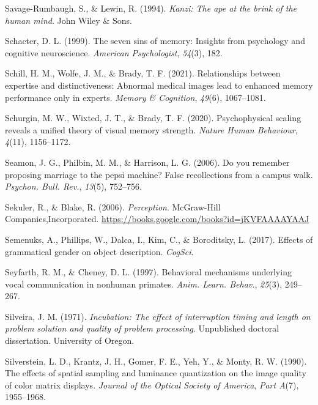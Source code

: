 \documentclass[
]{krantz}
\newlength{\cslhangindent}
\newenvironment{CSLReferences}[2] %
 {\begin{list}{}{%
  \setlength{\itemindent}{0pt}
  \setlength{\leftmargin}{0pt}
  \setlength{\parsep}{0pt}
  \ifodd #1
   \setlength{\leftmargin}{\cslhangindent}
   \setlength{\itemindent}{-1\cslhangindent}
  \fi
  \setlength{\itemsep}{#2\baselineskip}}}
 {\end{list}}
\begin{document}
\begin{CSLReferences}{1}{0}
Savage-Rumbaugh, S., \& Lewin, R. (1994). \emph{Kanzi: The ape at the brink of the human mind}. John Wiley \& Sons.

Schacter, D. L. (1999). The seven sins of memory: Insights from psychology and cognitive neuroscience. \emph{American Psychologist}, \emph{54}(3), 182.

Schill, H. M., Wolfe, J. M., \& Brady, T. F. (2021). Relationships between expertise and distinctiveness: Abnormal medical images lead to enhanced memory performance only in experts. \emph{Memory \& Cognition}, \emph{49}(6), 1067--1081.

Schurgin, M. W., Wixted, J. T., \& Brady, T. F. (2020). Psychophysical scaling reveals a unified theory of visual memory strength. \emph{Nature Human Behaviour}, \emph{4}(11), 1156--1172.

Seamon, J. G., Philbin, M. M., \& Harrison, L. G. (2006). Do you remember proposing marriage to the pepsi machine? False recollections from a campus walk. \emph{Psychon. Bull. Rev.}, \emph{13}(5), 752--756.

Sekuler, R., \& Blake, R. (2006). \emph{Perception}. McGraw-Hill Companies,Incorporated. \url{https://books.google.com/books?id=jKVFAAAAYAAJ}

Semenuks, A., Phillips, W., Dalca, I., Kim, C., \& Boroditsky, L. (2017). Effects of grammatical gender on object description. \emph{CogSci}.

Seyfarth, R. M., \& Cheney, D. L. (1997). Behavioral mechanisms underlying vocal communication in nonhuman primates. \emph{Anim. Learn. Behav.}, \emph{25}(3), 249--267.

Silveira, J. M. (1971). \emph{Incubation: The effect of interruption timing and length on problem solution and quality of problem processing}. Unpublished doctoral dissertation. University of Oregon.

Silverstein, L. D., Krantz, J. H., Gomer, F. E., Yeh, Y., \& Monty, R. W. (1990). The effects of spatial sampling and luminance quantization on the image quality of color matrix displays. \emph{Journal of the Optical Society of America}, \emph{Part A}(7), 1955--1968.


\end{CSLReferences}
\end{document}
